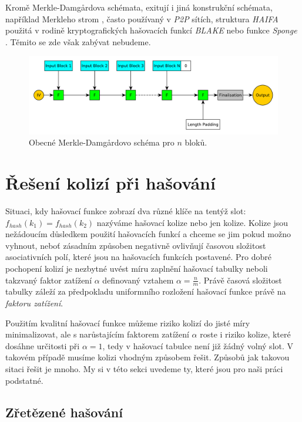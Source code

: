 Kromě Merkle-Damg\r{a}rdova schémata, exitují i jiná konstrukční schémata, například Merkleho strom 
\cite{merkle1}, často používaný v \textit{P2P} sítích,
struktura \textit{HAIFA} \cite{haifa} použitá v rodině kryptografických hašovacích funkcí \textit{BLAKE}
nebo funkce \textit{Sponge} \cite{sponge}. Těmito se zde však zabývat nebudeme.

\begin{figure}
	\centering
	\includegraphics[width=\textwidth]{fig/merkle_damgard}
	\caption{Obecné Merkle-Damg\r{a}rdovo schéma pro $n$ bloků.}
	\label{fig:merkle_damgard}
\end{figure}

\section{Řešení kolizí při hašování}
\label{sec:collisions}

Situaci, kdy hašovací funkce zobrazí dva různé klíče na tentýž slot:
$f_{hash} (k_{1}) = f_{hash} (k_{2})$ nazýváme hašovací kolize nebo jen kolize. 
Kolize jsou nežádoucím důsledkem použití hašovacích funkcí
a chceme se jim pokud možno vyhnout, neboť zásadním způsoben negativně ovlivňují 
časovou složitost asociativních polí, které jsou na hašovacích funkcích postavené. 
Pro dobré pochopení kolizí je nezbytné uvést míru zaplnění hašovací tabulky
neboli takzvaný faktor zatížení $\alpha$ definovaný vztahem $\alpha = \frac{n}{m}$.
Právě časová složitost tabulky záleží za předpokladu uniformního rozložení 
hašovací funkce právě na \textit{faktoru zatížení}. 

Použitím kvalitní hašovací funkce můžeme riziko kolizí do jisté míry minimalizovat, ale
s narůstajícím faktorem zatížení $\alpha$ roste i riziko kolize, které dosáhne 
určitosti při $\alpha = 1$, tedy v hašovací tabulce není již žádný volný slot.
V takovém případě musíme kolizi vhodným způsobem řešit. Způsobů jak takovou sitaci
řešit je mnoho. My si v této sekci uvedeme ty, které jsou pro naši práci podstatné.

\subsection{Zřetězené hašování}

